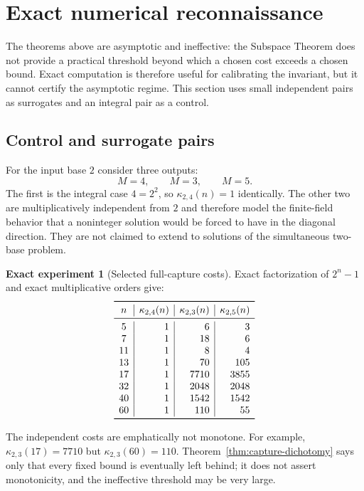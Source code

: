 \documentclass[11pt,oneside]{article}
\theoremstyle{definition}
\newtheorem{experiment}[theorem]{Exact experiment}
\theoremstyle{remark}
\begin{document}
\section{Exact numerical reconnaissance}
\label{sec:computation}

The theorems above are asymptotic and ineffective: the Subspace Theorem does not provide a
practical threshold beyond which a chosen cost exceeds a chosen bound.  Exact computation is
therefore useful for calibrating the invariant, but it cannot certify the asymptotic regime.
This section uses small independent pairs as surrogates and an integral pair as a control.

\subsection{Control and surrogate pairs}

For the input base $2$ consider three outputs:
\[
 M=4,\qquad M=3,\qquad M=5.
\]
The first is the integral case $4=2^2$, so $\kappa_{2,4}(n)=1$ identically.  The other two
are multiplicatively independent from $2$ and therefore model the finite-field behavior that
a noninteger solution would be forced to have in the diagonal direction.  They are not
claimed to extend to solutions of the simultaneous two-base problem.

\begin{experiment}[Selected full-capture costs]
\label{exp:cost-table}
Exact factorization of $2^n-1$ and exact multiplicative orders give:
\[
\begin{array}{c|r|r|r}
\toprule
n & \kappa_{2,4}(n) & \kappa_{2,3}(n) & \kappa_{2,5}(n)\\
\midrule
5  &1&6&3\\
7  &1&18&6\\
11 &1&8&4\\
13 &1&70&105\\
17 &1&7710&3855\\
32 &1&2048&2048\\
40 &1&1542&1542\\
60 &1&110&55\\
\bottomrule
\end{array}
\]
\end{experiment}

The independent costs are emphatically not monotone.  For example,
$\kappa_{2,3}(17)=7710$ but $\kappa_{2,3}(60)=110$.  Theorem~\ref{thm:capture-dichotomy}
says only that every fixed bound is eventually left behind; it does not assert monotonicity,
and the ineffective threshold may be very large.
\end{document}
